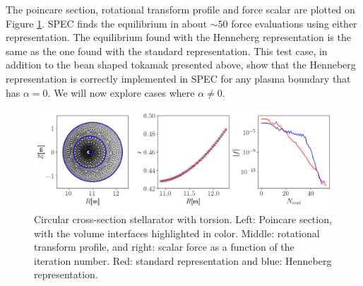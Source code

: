 \documentclass[my_thesis.tex]{subfiles}
\begin{document}
The poincare section, rotational transform profile and force scalar are plotted on Figure \ref{fig. circular stellarator henneberg represensation}. SPEC finds the equilibrium in about $\sim 50$ force evaluations using either representation. The equilibrium found with the Henneberg representation is the same as the one found with the standard representation. This test case, in addition to the bean shaped tokamak presented above, show that the Henneberg representation is correctly implemented in SPEC for any plasma boundary that has $\alpha=0$. We will now explore cases where $\alpha\neq 0$.


\begin{figure}
	\centering
	\includegraphics[width=\linewidth]{images/HennebergRepresentation/CircularTorsion.png}
	\caption{Circular cross-section stellarator with torsion. Left: Poincare section, with the volume interfaces highlighted in color. Middle: rotational transform profile, and right: scalar force as a function of the iteration number. Red: standard representation and blue: Henneberg representation.}
	\label{fig. circular stellarator henneberg represensation}
\end{figure}
\end{document}
